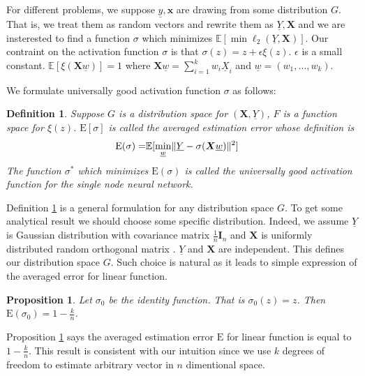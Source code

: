 \documentclass[conference,letterpaper]{IEEEtran}
\newtheorem{definition}{Definition}
\newtheorem{proposition}{Proposition}
\DeclarePairedDelimiter\norm{\lVert}{\rVert}
\def\E{\mathbb{E}}
\begin{document}
For different problems, we suppose $\underline{y}, \bm{x}$ are drawing from some distribution $G$.
That is, we treat them as random vectors and rewrite them as $\underline{Y}, \bm{X}$ and
we are insterested to find a function $\sigma$ which minimizes
$\E[ \min \ell_2(\underline{Y}, \bm{X})]$.
Our contraint on the activation function $\sigma$ is that
$\sigma(z) = z + \epsilon \xi(z)$.
$\epsilon$ is a small constant.
$\E[\xi(\bm{X}\underline{w})]=1$ where
$\bm{X}\underline{w} = \sum_{i=1}^k w_i \underline{X}_i$ and  $\underline{w}=(w_1, \dots, w_k)$.

We formulate universally good activation function $\sigma$ as follows:
\begin{definition}\label{def:ug}
Suppose $G$ is a distribution space for $(\bm{X}, \underline{Y})$,
$F$ is a function space for $\xi(z)$.
$\mathrm{E}[\sigma]$ is called the averaged estimation error whose definition is
\begin{align}\label{eq:ug}
\mathrm{E}(\sigma) = & \E[ \min_{\underline{w}} \norm{\underline{Y} - \sigma(\bm{X} \underline{w})}^2] 
\end{align}
The function $\sigma^*$ which minimizes $\mathrm{E}(\sigma)$
is called the universally good activation function for the single node neural network.
\end{definition}

Definition \ref{def:ug} is a general formulation for any distribution space $G$.
To get some analytical result we should choose some specific distribution.
Indeed, we assume $\underline{Y}$ is Gaussian distribution with covariance matrix $\frac{1}{n} \mathbf{I}_n$ and
$\bm{X}$ is uniformly distributed random orthogonal matrix \cite{eaton1989group}.
$\underline{Y}$ and $\bm{X}$ are independent.
This defines our distribution space $G$. Such choice is natural as it leads to simple expression of the averaged error for linear function.

\begin{proposition}\label{prop:linear}
Let $\sigma_0$ be the identity function. That is $\sigma_0(z) = z$. Then $\mathrm{E}(\sigma_0) = 1 - \frac{k}{n}$.\end{proposition}

Proposition \ref{prop:linear} says the averaged estimation error $\mathrm{E}$ for linear function is equal to $1-\frac{k}{n}$.
This result is consistent with our intuition
since we use $k$ degrees of freedom to estimate arbitrary vector in $n$ dimentional space.
\end{document}
